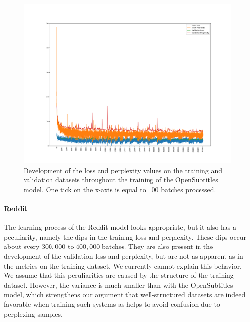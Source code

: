\begin{figure}[H]
	\includegraphics[width=\linewidth]{img/plots/opensubtitles_not_reversed/train_metrics.png}
	\caption{Development of the loss and perplexity values on the training and validation datasets throughout the training of the OpenSubtitles model. One tick on the x-axis is equal to $100$ batches processed.}
	\label{results:learning_process:metrics:opensubtitles}
\end{figure}

\paragraph{Reddit} The learning process of the Reddit model looks appropriate, but it also has a peculiarity, namely the dips in the training loss and perplexity. These dips occur about every $300,000$ to $400,000$ batches. They are also present in the development of the validation loss and perplexity, but are not as apparent as in the metrics on the training dataset. We currently cannot explain this behavior. We assume that this peculiarities are caused by the structure of the training dataset. However, the variance is much smaller than with the OpenSubtitles model, which strengthens our argument that well-structured datasets are indeed favorable when training such systems as helps to avoid confusion due to perplexing samples.

